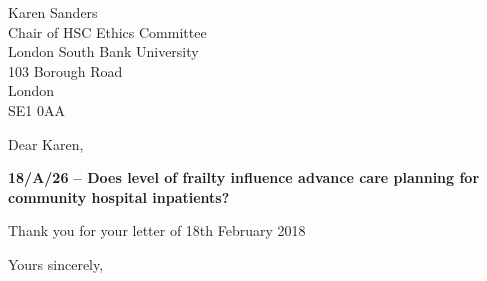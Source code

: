 \documentclass
[
	12pt,
	a4paper,
	oneside
]{letter}
\begin{document}
\begin{letter}{Karen Sanders\\
		Chair of HSC Ethics Committee\\
		London South Bank University\\
		103 Borough Road\\
		London\\
		SE1 0AA}
\opening{Dear Karen,}

\bigskip
\textbf{18/A/26 -- Does level of frailty influence advance care planning 
	for community hospital inpatients? }
\bigskip

Thank you for your letter of 18th February 2018
\closing{Yours sincerely,}


\end{letter}
\end{document}
